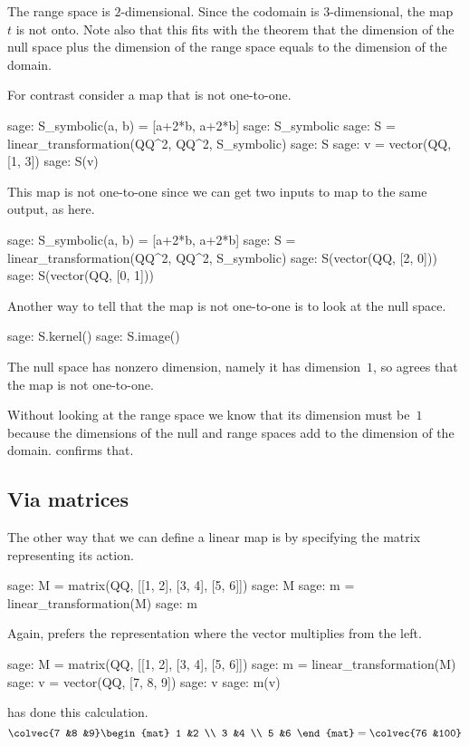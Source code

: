 The range space is $2$-dimensional. 
Since the codomain is $3$-dimensional, the map~$t$ is not onto.
Note also that this fits with the theorem that
the dimension of the null space plus the dimension of the 
range space equals to the dimension of the domain.

For contrast consider a map that is not one-to-one.
\begin{sagecommandline}
sage: S_symbolic(a, b) = [a+2*b, a+2*b]
sage: S_symbolic
sage: S = linear_transformation(QQ^2, QQ^2, S_symbolic)
sage: S
sage: v = vector(QQ, [1, 3])  
sage: S(v)
\end{sagecommandline}
This map is not one-to-one since we can get two inputs
to map to the same output, 
as here.  
\begin{sagecommandline}
sage: S_symbolic(a, b) = [a+2*b, a+2*b]
sage: S = linear_transformation(QQ^2, QQ^2, S_symbolic)
sage: S(vector(QQ, [2, 0]))
sage: S(vector(QQ, [0, 1]))
\end{sagecommandline}
\noindent
Another way to tell that the map is not one-to-one is to look at the 
null space.
\begin{sagecommandline}
sage: S.kernel()
sage: S.image()
\end{sagecommandline}
The null space has nonzero dimension, namely it 
has dimension~$1$,
so \Sage{} agrees that the map is not one-to-one.

Without looking at the range space we know that its dimension must be~$1$ 
because the dimensions of the null and range spaces add to
the dimension of the domain.
\Sage{} confirms that.



\subsection{Via matrices}
The other way that we can define a linear map is by specifying 
the matrix representing its action.
\begin{sagecommandline}
sage: M = matrix(QQ, [[1, 2], [3, 4], [5, 6]])
sage: M
sage: m = linear_transformation(M)
sage: m  
\end{sagecommandline}
Again, \Sage{} prefers the 
representation where the vector multiplies
from the left.
\begin{sagecommandline}
sage: M = matrix(QQ, [[1, 2], [3, 4], [5, 6]])
sage: m = linear_transformation(M)
sage: v = vector(QQ, [7, 8, 9])
sage: v
sage: m(v)  
\end{sagecommandline}
\Sage{} has done this calculation.
\begin{equation*}
  \colvec{7 &8 &9}
  \begin{mat}
    1 &2 \\
    3 &4 \\
    5 &6
  \end{mat}
  =\colvec{76 &100}
\end{equation*}

